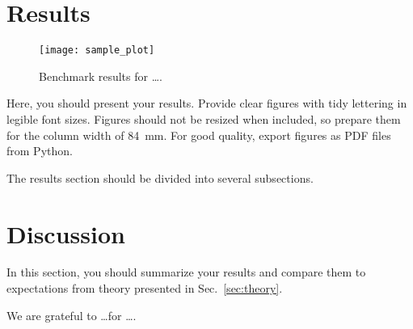 \documentclass[sigconf, nonacm, screen, balance=False]{acmart}
\begin{document}
\section{Results}\label{sec:results}

\begin{figure}
  \centering
  \texttt{[image: sample\_plot]}
  \caption{Benchmark results for \dots.}
  \label{fig:bench}
\end{figure}

Here, you should present your results. Provide clear figures with tidy
lettering in legible font sizes. Figures should not be resized when
included, so prepare them for the column width of 84~mm. For good
quality, export figures as PDF files from Python.

The results section should be divided into several subsections.

\section{Discussion}\label{sec:discussion}

In this section, you should summarize your results and compare them to
expectations from theory presented in Sec.~\ref{sec:theory}.

\begin{acks}
We are grateful to \dots for \dots.
\end{acks}



%
\end{document}
